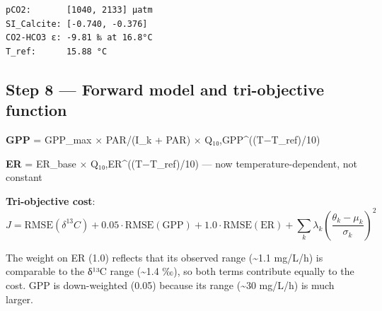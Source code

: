 \documentclass[
  letterpaper,
  DIV=11,
  numbers=noendperiod]{scrartcl}
\begin{document}
\begin{verbatim}
pCO2:       [1040, 2133] µatm
SI_Calcite: [-0.740, -0.376]
CO2-HCO3 ε: -9.81 ‰ at 16.8°C
T_ref:      15.88 °C
\end{verbatim}

\subsection{Step 8 --- Forward model and tri-objective
function}\label{step-8-forward-model-and-tri-objective-function}

\textbf{GPP} = GPP\_max × PAR/(I\_k + PAR) × Q₁₀,GPP\^{}((T−T\_ref)/10)

\textbf{ER} = ER\_base × Q₁₀,ER\^{}((T−T\_ref)/10) --- now
temperature-dependent, not constant

\textbf{Tri-objective cost}:
\[J = \mathrm{RMSE}(\delta^{13}C) + 0.05 \cdot \mathrm{RMSE}(\mathrm{GPP}) + 1.0 \cdot \mathrm{RMSE}(\mathrm{ER}) + \sum_k \lambda_k \left(\frac{\theta_k - \mu_k}{\sigma_k}\right)^2\]

The weight on ER (1.0) reflects that its observed range
(\textasciitilde1.1 mg/L/h) is comparable to the δ¹³C range
(\textasciitilde1.4 ‰), so both terms contribute equally to the cost.
GPP is down-weighted (0.05) because its range (\textasciitilde30 mg/L/h)
is much larger.
\end{document}

